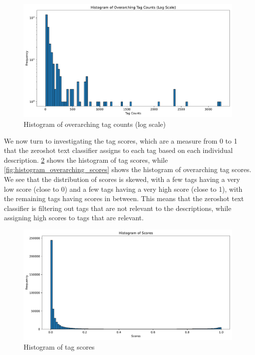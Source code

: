 \begin{figure}[h]
    \centering
    \includegraphics[width=\textwidth]{figures/histogram_overarching_tag_counts_log.pdf}
    \caption{Histogram of overarching tag counts (log scale)}
    \label{fig:histogram_overarching_tag_counts_log}
\end{figure}

We now turn to investigating the tag scores, which are a measure from 0 to 1 that the zeroshot text classifier assigns to each tag based on each individual description. \cref{fig:histogram_scores} shows the histogram of tag scores, while \cref{fig:histogram_overarching_scores} shows the histogram of overarching tag scores. We see that the distribution of scores is skewed, with a few tags having a very low score (close to 0) and a few tags having a very high score (close to 1), with the remaining tags having scores in between. This means that the zeroshot text classifier is filtering out tags that are not relevant to the descriptions, while assigning high scores to tags that are relevant.

\begin{figure}[h]
    \centering
    \includegraphics[width=\textwidth]{figures/histogram_scores.pdf}
    \caption{Histogram of tag scores}
    \label{fig:histogram_scores}
\end{figure}

